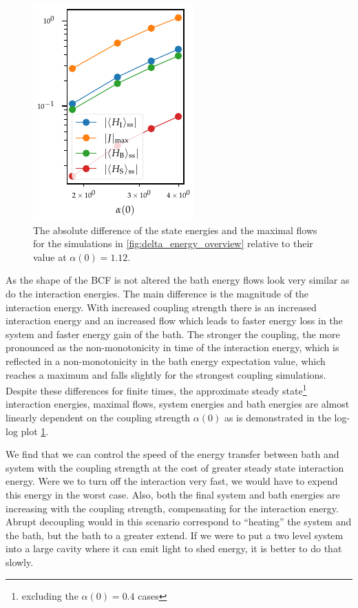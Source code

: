 \begin{figure}
  \centering
  \includegraphics{figs/one_bath_syst/final_states_flows}
  \caption{\label{fig:delta_fs_flow} The absolute difference of the state energies and the
  maximal flows for the simulations in
  \cref{fig:delta_energy_overview} relative to their value at \(α(0)=1.12\).}
\end{figure}
As the shape of the BCF is not altered the bath energy flows look very
similar as do the interaction energies. The main difference is the
magnitude of the interaction energy. With increased coupling strength
there is an increased interaction energy and an increased flow which
leads to faster energy loss in the system and faster energy gain of
the bath. The stronger the coupling, the more pronounced as the
non-monotonicity in time of the interaction energy, which is reflected
in a non-monotonicity in the bath energy expectation value, which
reaches a maximum and falls slightly for the strongest coupling
simulations. Despite these differences for finite times, the
approximate steady state\footnote{excluding the \(α(0)=0.4\) cases}
interaction energies, maximal flows, system energies and bath energies
are almost linearly dependent on the coupling strength \(α(0)\) as is
demonstrated in the log-log plot \cref{fig:delta_fs_flow}.

We find that we can control the speed of the energy transfer between
bath and system with the coupling strength at the cost of greater
steady state interaction energy. Were we to turn off the interaction
very fast, we would have to expend this energy in the worst
case. Also, both the final system and bath energies are increasing
with the coupling strength, compensating for the interaction
energy. Abrupt decoupling would in this scenario correspond to
``heating'' the system and the bath, but the bath to a greater
extend. If we were to put a two level system into a large cavity where
it can emit light to shed energy, it is better to do that slowly.


